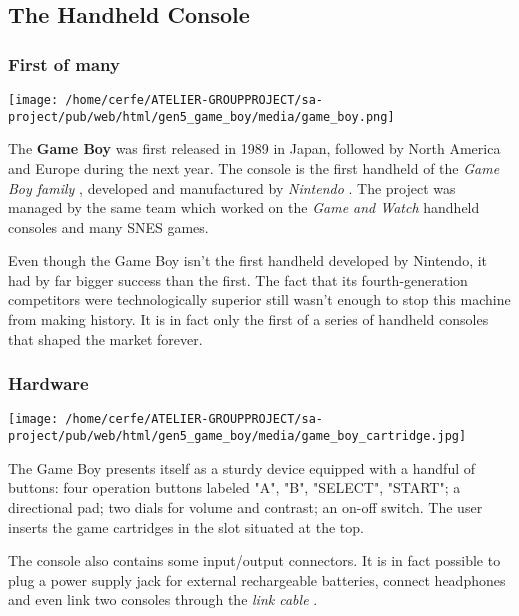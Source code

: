 \documentclass[a4paper,10pt]{book}
\begin{document}
 \subsection{The Handheld Console }
 
 \subsubsection{First of many }
 \texttt{[image: /home/cerfe/ATELIER-GROUPPROJECT/sa-project/pub/web/html/gen5\_game\_boy/media/game\_boy.png]}
 
          The  \textbf{Game Boy }  was first released in 1989 in Japan, followed by
          North America and Europe during the next year. The console is the first
          handheld of the  \textit{Game Boy family }, developed and manufactured by
           \textit{Nintendo }. The project was managed by the same team which worked
          on the  \textit{Game and Watch } handheld consoles and many SNES games.
           
          Even though the Game Boy isn't the first handheld developed by Nintendo,
          it had by far bigger success than the first. The fact that its
          fourth-generation competitors were technologically superior still wasn't
          enough to stop this machine from making history. It is in fact only the first
          of a series of handheld consoles that shaped the market forever.
         
 
 \subsubsection{Hardware }
 \texttt{[image: /home/cerfe/ATELIER-GROUPPROJECT/sa-project/pub/web/html/gen5\_game\_boy/media/game\_boy\_cartridge.jpg]}
 
          The Game Boy presents itself as a sturdy device equipped with a handful of
          buttons: four operation buttons labeled "A", "B", "SELECT", "START"; a
          directional pad; two dials for volume and contrast; an on-off switch. The
          user inserts the game cartridges in the slot situated at the top.
           
          The console also contains some input/output connectors. It is in fact
          possible to plug a power supply jack for external rechargeable batteries,
          connect headphones and even link two consoles through the  \textit{link cable }.
         
 
 
\end{document}
